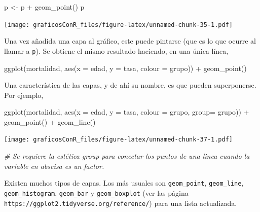 \documentclass[
]{article}
\newenvironment{Shaded}{\begin{snugshade}}{\end{snugshade}}
\newcommand{\AttributeTok}[1]{\textcolor[rgb]{0.77,0.63,0.00}{#1}}
\newcommand{\CommentTok}[1]{\textcolor[rgb]{0.56,0.35,0.01}{\textit{#1}}}
\newcommand{\FunctionTok}[1]{\textcolor[rgb]{0.00,0.00,0.00}{#1}}
\newcommand{\NormalTok}[1]{#1}
\newcommand{\OtherTok}[1]{\textcolor[rgb]{0.56,0.35,0.01}{#1}}
\newcommand{\SpecialCharTok}[1]{\textcolor[rgb]{0.00,0.00,0.00}{#1}}
\numberwithin{ejcnt}{section}
\begin{document}
\begin{Shaded}
\begin{Highlighting}[]
\NormalTok{p }\OtherTok{\textless{}{-}}\NormalTok{ p }\SpecialCharTok{+} \FunctionTok{geom\_point}\NormalTok{()}
\NormalTok{p}
\end{Highlighting}
\end{Shaded}

\texttt{[image: graficosConR\_files/figure-latex/unnamed-chunk-35-1.pdf]}

Una vez añadida una capa al gráfico, este puede pintarse (que es lo que ocurre al llamar a \texttt{p}). Se obtiene el mismo resultado haciendo, en una única línea,

\begin{Shaded}
\begin{Highlighting}[]
\FunctionTok{ggplot}\NormalTok{(mortalidad, }\FunctionTok{aes}\NormalTok{(}\AttributeTok{x =}\NormalTok{ edad, }\AttributeTok{y =}\NormalTok{ tasa, }\AttributeTok{colour =}\NormalTok{ grupo)) }\SpecialCharTok{+} \FunctionTok{geom\_point}\NormalTok{()}
\end{Highlighting}
\end{Shaded}

Una característica de las capas, y de ahí su nombre, es que pueden superponerse. Por ejemplo,

\begin{Shaded}
\begin{Highlighting}[]
\FunctionTok{ggplot}\NormalTok{(mortalidad, }\FunctionTok{aes}\NormalTok{(}\AttributeTok{x =}\NormalTok{ edad, }\AttributeTok{y =}\NormalTok{ tasa, }\AttributeTok{colour =}\NormalTok{ grupo, }\AttributeTok{group=}\NormalTok{ grupo)) }\SpecialCharTok{+} 
  \FunctionTok{geom\_point}\NormalTok{() }\SpecialCharTok{+} \FunctionTok{geom\_line}\NormalTok{()}
\end{Highlighting}
\end{Shaded}

\texttt{[image: graficosConR\_files/figure-latex/unnamed-chunk-37-1.pdf]}

\begin{Shaded}
\begin{Highlighting}[]
\CommentTok{\# Se requiere la estética \textasciigrave{}group\textasciigrave{} para conectar los puntos de una linea cuando la variable en abscisa es un factor.}
\end{Highlighting}
\end{Shaded}

Existen muchos tipos de capas. Los más usuales son \texttt{geom\_point}, \texttt{geom\_line}, \texttt{geom\_histogram}, \texttt{geom\_bar} y \texttt{geom\_boxplot} (ver las página \texttt{https://ggplot2.tidyverse.org/reference/}) para una lista actualizada.
\end{document}
